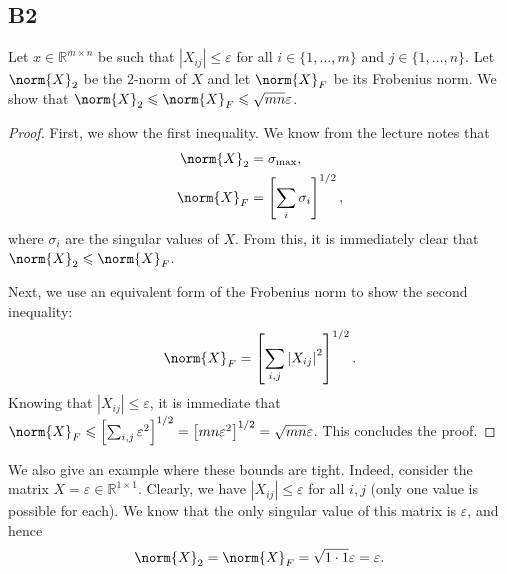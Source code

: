 \documentclass[11pt]{article}
\newcommand{\abs}[1]{\left\lvert#1\right\lvert}
\newcommand{\real}{\mathbb{R}} %
\newcommand{\snorm}[1]{\norm{#1}_2} %
\newcommand{\fnorm}[1]{\norm{#1}_F} %
\begin{document}
\subsection*{B2}
Let \(x \in \real^{m \times n}\) be such that \(\abs{X_{ij}} \leqslant \varepsilon\) for all \(i \in \{1, \dots, m\}\) and \(j \in \{1, \dots, n\}\).
Let \(\snorm{X}\) be the \(2\)-norm of \(X\) and let \(\fnorm{X}\) be its Frobenius norm.
We show that \(\snorm{X} \leqslant \fnorm{X} \leqslant \sqrt{mn} \varepsilon\).
\begin{proof}
	First, we show the first inequality.
	We know from the lecture notes that
	\begin{align*}
	\snorm{X} &= \sigma_{\textnormal{max}},\\
	\fnorm{X} &= \left[\sum_i \sigma_i\right]^{1/2},
	\end{align*}
	where \(\sigma_i\) are the singular values of \(X\).
	From this, it is immediately clear that \(\snorm{X} \leqslant \fnorm{X}\).
	
	Next, we use an equivalent form of the Frobenius norm to show the second inequality:
	\[
	\fnorm{X} = \left[\sum_{i, j} \abs{X_{ij}}^2 \right]^{1/2}.
	\]
	Knowing that \(\abs{X_{ij}} \leqslant \varepsilon\), it is immediate that \(\fnorm{X} \leqslant \left[\sum_{i, j} \varepsilon^2\right]^{1/2} = \left[mn \varepsilon^2\right]^{1/2} = \sqrt{mn} \varepsilon\).
	This concludes the proof.
\end{proof}

We also give an example where these bounds are tight.
Indeed, consider the matrix \(X = \varepsilon \in \real^{1 \times 1}\).
Clearly, we have \(\abs{X_{ij}} \leqslant \varepsilon \) for all \(i, j\) (only one value is possible for each).
We know that the only singular value of this matrix is \(\varepsilon\), and hence
\[
\snorm{X} = \fnorm{X} = \sqrt{1 \cdot 1} \varepsilon = \varepsilon.
\]
\end{document}
